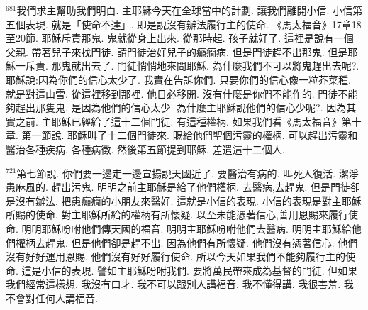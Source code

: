 \documentclass{book}
\begin{document}
$^{681}$我們求主幫助我們明白.
主耶穌今天在全球當中的計劃.
讓我們離開小信.
小信第五個表現.
就是「使命不達」.
即是說沒有辦法履行主的使命.
《馬太福音》17章18至20節.
耶穌斥責那鬼.
鬼就從身上出來.
從那時起.
孩子就好了.
這裡是說有一個父親.
帶著兒子來找門徒.
請門徒治好兒子的癲癇病.
但是門徒趕不出那鬼.
但是耶穌一斥責.
那鬼就出去了.
門徒悄悄地來問耶穌.
為什麼我們不可以將鬼趕出去呢?.
耶穌說:因為你們的信心太少了.
我實在告訴你們.
只要你們的信心像一粒芥菜種.
就是對這山雪.
從這裡移到那裡.
他日必移開.
沒有什麼是你們不能作的.
門徒不能夠趕出那隻鬼.
是因為他們的信心太少.
為什麼主耶穌說他們的信心少呢?.
因為其實之前.
主耶穌已經給了這十二個門徒.
有這種權柄.
如果我們看《馬太福音》第十章.
第一節說.
耶穌叫了十二個門徒來.
賜給他們聖個污靈的權柄.
可以趕出污靈和醫治各種疾病.
各種病徵.
然後第五節提到耶穌.
差遣這十二個人.

$^{721}$第七節說.
你們要一邊走一邊宣揚說天國近了.
要醫治有病的.
叫死人復活.
潔淨患麻風的.
趕出污鬼.
明明之前主耶穌是給了他們權柄.
去醫病,去趕鬼.
但是門徒卻是沒有辦法.
把患癲癇的小朋友來醫好.
這就是小信的表現.
小信的表現是對主耶穌所賜的使命.
對主耶穌所給的權柄有所懷疑.
以至未能憑著信心,善用恩賜來履行使命.
明明耶穌吩咐他們傳天國的福音.
明明主耶穌吩咐他們去醫病.
明明主耶穌給他們權柄去趕鬼.
但是他們卻是趕不出.
因為他們有所懷疑.
他們沒有憑著信心.
他們沒有好好運用恩賜.
他們沒有好好履行使命.
所以今天如果我們不能夠履行主的使命.
這是小信的表現.
譬如主耶穌吩咐我們.
要將萬民帶來成為基督的門徒.
但如果我們經常這樣想.
我沒有口才.
我不可以跟別人講福音.
我不懂得講.
我很害羞.
我不會對任何人講福音.
\newpage

\allsectionsfont{\centering}

\setlength\parindent{0pt}
\setlength{\columnsep}{1.25em}
\setlength{\parfillskip}{0pt}
\setlength{\tabcolsep}{1em}
\raggedbottom



\newfontfamily{}
\newfontfamily{}
\newfontfamily{}
\newfontfamily{}
\newfontfamily{}
\newcommand{\chfont}[1]{\centerfont{\huge\textcolor{hcolor}{#1}}}
\newcommand{\leftcitation}[1]{\leftcitationfont{\Large\textcolor{hcolor}{#1}}}
\newcommand{\rightcitation}[1]{\rightcitationfont{\normalsize\textcolor{rcolor}{#1}}}
\newfontfamily{}
\end{document}
